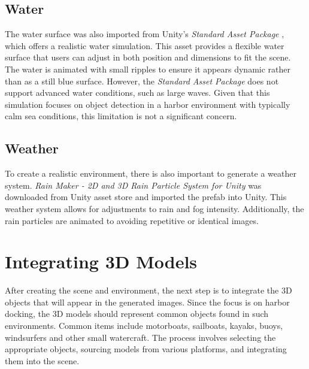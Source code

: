 \subsection{Water}
The water surface was also imported from Unity's \textit{Standard Asset Package} \cite{unity_standard_assets_installation}, which offers a realistic water simulation. This asset provides a flexible water surface that users can adjust in both position and dimensions to fit the scene. The water is animated with small ripples to ensure it appears dynamic rather than as a still blue surface. However, the \textit{Standard Asset Package} does not support advanced water conditions, such as large waves. Given that this simulation focuses on object detection in a harbor environment with typically calm sea conditions, this limitation is not a significant concern.

\subsection{Weather}
To create a realistic environment, there is also important to generate a weather system. \textit{Rain Maker - 2D and 3D Rain Particle System for Unity} \cite{unity_rain_maker} was downloaded from Unity asset store and imported the prefab into Unity. This weather system allows for adjustments to rain and fog intensity. Additionally, the rain particles are animated to avoiding repetitive or identical images.

\section{Integrating 3D Models}
After creating the scene and environment, the next step is to integrate the 3D objects that will appear in the generated images. Since the focus is on harbor docking, the 3D models should represent common objects found in such environments. Common items include motorboats, sailboats, kayaks, buoys, windsurfers and other small watercraft. The process involves selecting the appropriate objects, sourcing models from various platforms, and integrating them into the scene.

